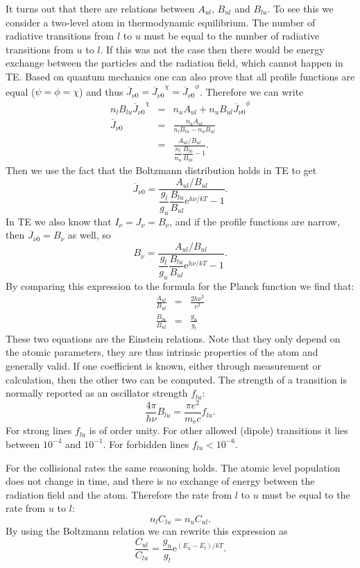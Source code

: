 \documentclass[12pt]{article}
\numberwithin{equation}{section}
\def\exp{\mathrm{e}}
\def\Inu{\ensuremath{I_{\nu}}}
\def\Jnu{\ensuremath{J_{\nu}}}
\def\Bnu{\ensuremath{B_{\nu}}}
\def\Jbar{\ensuremath{\overline{J}_{\nu0}}}
\newcommand{\be}{\begin{equation}}
\newcommand{\ee}{\end{equation}}
\newcommand{\bea}{\begin{eqnarray}}
\newcommand{\eea}{\end{eqnarray}}
\begin{document}
It turns out that there are relations between $A_{ul}$, $B_{ul}$ and $B_{lu}$. To see this we consider a two-level atom in thermodynamic equilibrium. The number of radiative transitions from $l$ to $u$ must be equal to the number of radiative transitions from $u$ to $l$. If this was not the case then there would be energy exchange between the particles and the radiation field, which cannot happen in TE. Based on quantum mechanics one can also prove that all profile functions are equal ($\psi=\phi=\chi$) and thus $\Jbar = \Jbar^\chi = \Jbar^\phi$. Therefore we can write
\bea
n_l B_{lu} \Jbar^\chi  &= & n_u A_{ul} + n_u B_{ul} \Jbar^\phi \nonumber \\
\Jbar &=& \frac{n_u A_{ul} }{n_l B_{lu} -n_u B_{ul}}   \nonumber \\
   & = & \frac{A_{ul}/B_{ul} }{\dfrac{n_l}{n_u} \dfrac{B_{lu}}{B_{ul}} - 1}.
\eea
Then we use the fact that the Boltzmann distribution holds in TE to get
\be
\Jbar =  \frac{A_{ul}/B_{ul} }{\dfrac{g_l}{g_u} \dfrac{B_{lu}}{B_{ul}} \exp^{h\nu /kT}- 1}.
\ee
In  TE we also know that $\Inu = \Jnu = \Bnu$, and if the profile functions are narrow, then $\Jbar = \Bnu$ as well, so
\be
\Bnu =  \frac{A_{ul}/B_{ul} }{\dfrac{g_l}{g_u} \dfrac{B_{lu}}{B_{ul}} \exp^{h\nu /kT}- 1}.
\ee
By comparing this expression to the formula for the Planck function we find that:
\bea
\frac{A_{ul}}{B_{ul} } &=& \frac{2 h \nu^3}{c^2} \\
\frac{B_{lu}}{B_{ul}} &=& \frac{g_u}{g_l}
\eea
These two equations are the Einstein relations. Note that they only depend on the atomic parameters, they are thus intrinsic properties of the atom and generally valid. If one coefficient is known, either through measurement or calculation, then the other two can be computed.
The strength of a transition is normally reported as an oscillator strength $f_{lu}$:
\be
\frac{4 \pi}{h \nu} B_{lu} = \frac{ \pi e^2}{m_\mathrm{e} c} f_{lu}.
\ee
For strong lines $f_{lu}$ is of order unity. For other allowed (dipole) transitions it lies between $10^{-4}$ and $10^{-1}$. For forbidden lines $f_{lu}< 10^{-6}$.

For the collisional rates the same reasoning holds. The atomic level population does not change in time, and there is no exchange of energy between the radiation field and the atom. Therefore the rate from $l$ to $u$ must be equal to the rate from $u$ to $l$:
\be
n_l C_{lu} = n_u C_{ul}.
\ee
By using the Boltzmann relation we can rewrite this expression as
\be
\frac{C_{ul}}{C_{lu}} = \frac{g_u}{g_l} \exp^{(E_u-E_l) / kT}.
\ee
\end{document}
